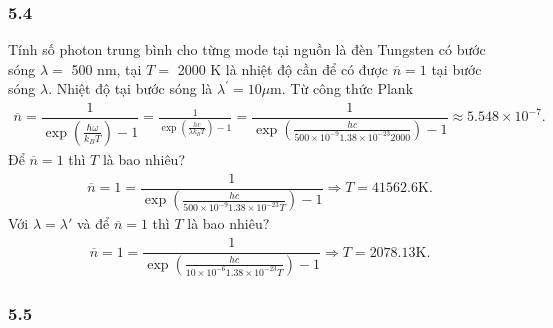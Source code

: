 \documentclass{article}
\newcommand{\f}[2]{\dfrac{#1}{#2}}
\begin{document}
\subsubsection*{5.4}
Tính số photon trung bình cho từng mode tại nguồn là đèn Tungsten có bước sóng $\lambda =$ 500 nm, tại $T = $ 2000 K là nhiệt độ cần để có được $\overline{n} = 1$ tại bước sóng $\lambda$. Nhiệt độ tại bước sóng là $\lambda^{'} = 10 \mu$m. Từ công thức Plank
\begin{align*}
	\overline{n} = \f{1}{\exp(\frac{\hbar \omega}{k_{B} T}) - 1} = \frac{1}{\exp(\frac{hc}{\lambda k_{B} T}) - 1} = \f{1}{\exp(\frac{hc}{500\times 10^{-9} 1.38 \times 10^{-23} 2000}) - 1} \approx 5.548 \times 10^{-7}. %
\end{align*}
Để $\overline{n} = 1$ thì $T$ là bao nhiêu?
\begin{align*}
	\overline{n} = 1 = \f{1}{\exp(\frac{hc}{500\times 10^{-9} 1.38 \times 10^{-23} T}) - 1} \Rightarrow T = 41562.6 \text{K}.
\end{align*}
Với $\lambda = \lambda'$ và để $\overline{n} = 1$ thì $T$ là bao nhiêu?
\begin{align*}
	\overline{n} = 1 = \f{1}{\exp(\frac{hc}{10 \times 10^{-6} 1.38 \times 10^{-23} T}) - 1} \Rightarrow T = 2078.13 \text{K}.
\end{align*}
\subsubsection*{5.5}
\end{document}

